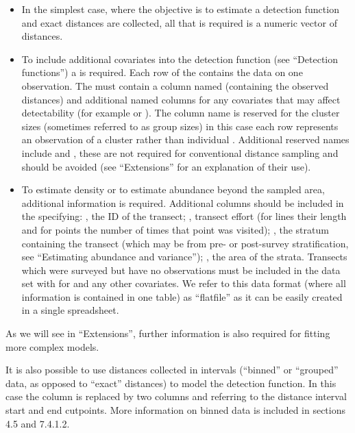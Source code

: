 \documentclass[article]{jss}\usepackage[]{graphicx}\usepackage[]{color}
\begin{document}
\begin{itemize}
\item In the simplest case, where the objective is to estimate a detection function and exact distances are collected, all that is required is a numeric vector of distances.
\item To include additional covariates into the detection function (see ``Detection functions'') a  is required. Each row of the  contains the data on one observation. The  must contain a column named  (containing the observed distances) and additional named columns for any covariates that may affect detectability (for example  or ). The column name  is reserved for the cluster sizes (sometimes referred to as group sizes) in this case each row represents an observation of a cluster rather than individual \citep[see][Section 1.4.3 for more on defining clusters and ``Extensions'' below for one approach to dealing with uncertain cluster size]{Buckland:2001vm}. Additional reserved names include  and , these are not required for conventional distance sampling and should be avoided (see ``Extensions'' for an explanation of their use).
\item To estimate density or to estimate abundance beyond the sampled area, additional information is required. Additional columns should be included in the  specifying: , the ID of the transect; , transect effort (for lines their length and for points the number of times that point was visited); , the stratum containing the transect (which may be from pre- or post-survey stratification, see ``Estimating abundance and variance''); , the area of the strata. Transects which were surveyed but have no observations must be included in the data set with  for  and any other covariates. We refer to this data format (where all information is contained in one table) as ``flatfile'' as it can be easily created in a single spreadsheet.
\end{itemize}

As we will see in ``Extensions'', further information is also required for fitting more complex models.

It is also possible to use distances collected in intervals (``binned'' or ``grouped'' data, as opposed to ``exact'' distances) to model the detection function. In this case the column  is replaced by two columns  and  referring to the distance interval start and end cutpoints. More information on binned data is included in \cite{Buckland:2001vm} sections 4.5 and 7.4.1.2.
\end{document}
